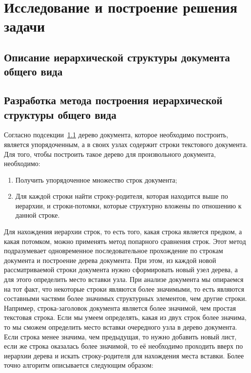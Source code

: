 \section{Исследование и построение решения задачи}
\label{sec:Chapter3} 

\subsection{Описание иерархической структуры документа общего вида}
\label{subsec:structuredescription}

\subsection{Разработка метода построения иерархической структуры общего вида}
\label{subsec:extractmethod}

Согласно подсекции~\ref{subsec:structuredescription} дерево документа, которое необходимо построить,
является упорядоченным, а в своих узлах содержит строки текстового документа.
Для того, чтобы построить такое дерево для произвольного документа, необходимо:
\begin{enumerate}
    \item Получить упорядоченное множество строк документа;
    \item Для каждой строки найти строку-родителя, которая находится выше по иерархии, и строки-потомки, которые структурно вложены по отношению к данной строке.
\end{enumerate}
Для нахождения иерархии строк, то есть того, какая строка является предком, а какая потомком,
можно применять метод попарного сравнения строк.
Этот метод подразумевает одновременное последовательное прохождение по строкам документа и построение дерева документа.
При этом, из каждой новой рассматриваемой строки документа нужно сформировать новый узел дерева, а для этого определить место вставки узла.
При анализе документа мы опираемся на тот факт, что некоторые строки являются более значимыми,
то есть являются составными частями более значимых структурных элементов, чем другие строки.
Например, строка-заголовок документа является более значимой, чем простая текстовая строка.
Если мы умеем определять, какая из двух строк более значима, то мы сможем определить место вставки очередного узла в дерево документа.
Если строка менее значима, чем предыдущая, то нужно добавить новый лист, если же строка оказалась более значимой,
то её необходимо проходить вверх по иерархии дерева и искать строку-родителя для нахождения места вставки.
Более точно алгоритм описывается следующим образом:

